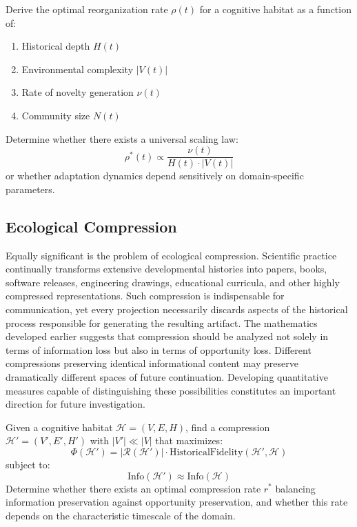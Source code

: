 \documentclass[12pt,oneside]{article}
\theoremstyle{remark}
\begin{document}
\begin{problem}
Derive the optimal reorganization rate \(\rho(t)\) for a cognitive habitat as a function of:
\begin{enumerate}
\item Historical depth \(H(t)\)
\item Environmental complexity \(|V(t)|\)
\item Rate of novelty generation \(\nu(t)\)
\item Community size \(N(t)\)
\end{enumerate}
Determine whether there exists a universal scaling law:
\[
\rho^*(t) \propto \frac{\nu(t)}{H(t) \cdot |V(t)|}
\]
or whether adaptation dynamics depend sensitively on domain-specific parameters.
\end{problem}

\subsection{Ecological Compression}

Equally significant is the problem of ecological compression. Scientific practice continually transforms extensive developmental histories into papers, books, software releases, engineering drawings, educational curricula, and other highly compressed representations. Such compression is indispensable for communication, yet every projection necessarily discards aspects of the historical process responsible for generating the resulting artifact. The mathematics developed earlier suggests that compression should be analyzed not solely in terms of information loss but also in terms of opportunity loss. Different compressions preserving identical informational content may preserve dramatically different spaces of future continuation. Developing quantitative measures capable of distinguishing these possibilities constitutes an important direction for future investigation.

\begin{problem}
Given a cognitive habitat \(\mathcal{H} = (V, E, H)\), find a compression \(\mathcal{H}' = (V', E', H')\) with \(|V'| \ll |V|\) that maximizes:
\[
\Phi(\mathcal{H}') = |\mathcal{R}(\mathcal{H}')| \cdot \text{HistoricalFidelity}(\mathcal{H}', \mathcal{H})
\]
subject to:
\[
\text{Info}(\mathcal{H}') \approx \text{Info}(\mathcal{H})
\]
Determine whether there exists an optimal compression rate \(r^*\) balancing information preservation against opportunity preservation, and whether this rate depends on the characteristic timescale of the domain.
\end{problem}
\end{document}
